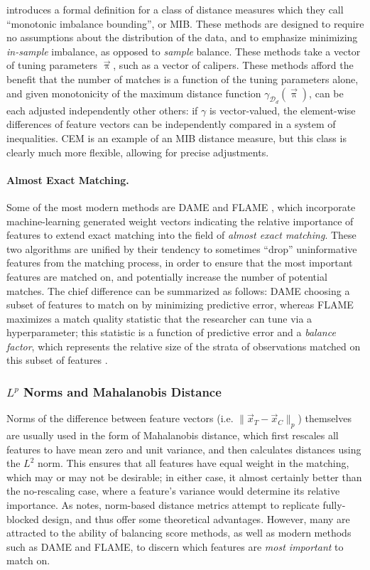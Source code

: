 \documentclass[11pt]{extarticle}
\begin{document}
\textcite{iacus_multivariate_2011} introduces a formal definition for a class of distance measures which they call ``monotonic imbalance bounding'', or MIB. These methods are designed to require no assumptions about the distribution of the data, and to emphasize minimizing \emph{in-sample} imbalance, as opposed to \emph{sample} balance. These methods take a vector of tuning parameters $\vec{\uppi}$, such as a vector of calipers. These methods afford the benefit that the number of matches is a function of the tuning parameters alone, and given monotonicity of the maximum distance function $\gamma_{\mathcal{D}_{d}}(\vec{\uppi})$, can be each adjusted independently other others: if $\gamma$ is vector-valued, the element-wise differences of feature vectors can be independently compared in a system of inequalities. CEM is an example of an MIB distance measure, but this class is clearly much more flexible, allowing for precise adjustments.

\paragraph{Almost Exact Matching.} Some of the most modern methods are DAME \parencite{liu_interpretable_2019} and FLAME \cite{wang_flame_2021}, which incorporate machine-learning generated weight vectors indicating the relative importance of features to extend exact matching into the field of \emph{almost exact matching}. These two algorithms are unified by their tendency to sometimes ``drop'' uninformative features from the matching process, in order to ensure that the most important features are matched on, and potentially increase the number of potential matches. The chief difference can be summarized as follows: DAME choosing a subset of features to match on by minimizing predictive error, whereas FLAME maximizes a match quality statistic that the researcher can tune via a hyperparameter; this statistic is a function of predictive error and a \emph{balance factor}, which represents the relative size of the strata of observations matched on this subset of features \parencite{gupta_dame-flame_2021}.

\subsubsection{$L^p$ Norms and Mahalanobis Distance}
\label{subsubsec:normdist}

Norms of the difference between feature vectors (i.e. $\| \vec{x}_T - \vec{x}_C \|_p$) themselves are usually used in the form of Mahalanobis distance, which first rescales all features to have mean zero and unit variance, and then calculates distances using the $L^2$ norm.
This ensures that all features have equal weight in the matching, which may or may not be desirable; in either case, it almost certainly better than the no-rescaling case, where a feature's variance would determine its relative importance.
As \textcite{king_why_2019} notes, norm-based distance metrics attempt to replicate fully-blocked design, and thus offer some theoretical advantages.
However, many are attracted to the ability of balancing score methods, as well as modern methods such as DAME and FLAME, to discern which features are \emph{most important} to match on. 
\end{document}
